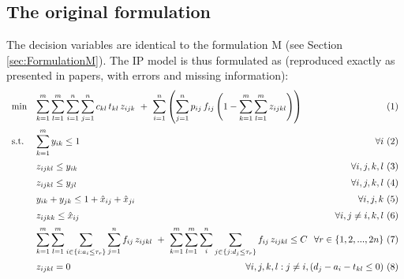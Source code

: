 \documentclass[preprint,12pt,authoryear]{elsarticle}
\begin{document}
%
%
\subsection{The original formulation}
\label{app:formulationsGoriginale}
\medskip

The decision variables are identical to the formulation M (see Section \ref{sec:FormulationM}).
%
The IP model is thus formulated as (reproduced exactly as presented in papers, with errors and missing information): \\
    \begin{equation*}
    \begin{array}{ll@{}ll}
    \text{min}  & \displaystyle\sum\limits^{m}_{k=1} \sum^{m}_{l=1} \sum^{n}_{i=1} \sum^{n}_{j=1} c_{kl} \, t_{kl} \, z_{ijk} \ + \ \sum^{n}_{i=1}\left( \sum^{n}_{j=1} p_{ij} \, f_{ij} \left( 1-\sum^{m}_{k=1} \sum^{m}_{l=1} z_{ijkl} \right) \right) & \  (1) \vspace{2mm}\\
    \text{s.t.}     & \displaystyle\sum\limits^{m}_{k=1} y_{ik} \leq 1  \hfill  \forall i & \ (2)\vspace{2mm}\\
                    & z_{ijkl} \leq y_{ik}  \hfill  \forall i,j,k,l & \ (3)\vspace{2mm}\\
                    & z_{ijkl} \leq y_{jl}   \hfill  \forall i,j,k,l & \ (4) \vspace{2mm}\\
                    & y_{ik} + y_{jk} \leq 1 + \hat{x}_{ij} + \hat{x}_{ji}   \hfill   \forall i,j,k & \ (5) \vspace{2mm}\\
                    & z_{ijkk} \leq \hat{x}_{ij}   \hfill  \forall i,j \neq i,k,l & \ (6) \vspace{2mm}\\
                    & \displaystyle\sum\limits_{k=1}^{m} \sum_{l=1}^{m} \sum_{i\in\{i:a_{i} \le \tau_r\}} \sum_{j=1}^{n} f_{ij} \, z_{ijkl} \ + \ \sum_{k=1}^{m} \sum_{l=1}^{m} \sum_{i}^{n} \sum_{j\in\{j:d_{j} \le \tau_r\}} f_{ij} \, z_{ijkl} \le  C \hspace{0.25cm} \hfill \forall r \in \{1,2,...,2n\} & \ (7) \vspace{2mm}\\ 
                    & z_{ijkl} = 0  \hfill  \forall i,j,k,l : j \neq i, (d_j - a_i - t_{kl} \leq 0) & \ (8) \vspace{2mm}\\

\end{array}
\end{equation*}
\end{document}
